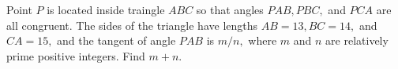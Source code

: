 Point $P$ is located inside traingle $ABC$ so that angles $PAB, PBC,$ and $PCA$ are all congruent.  The sides of the triangle have lengths $AB=13, BC=14,$ and $CA=15,$ and the tangent of angle $PAB$ is $m/n,$ where $m$ and $n$ are relatively prime positive integers.  Find $m+n.$